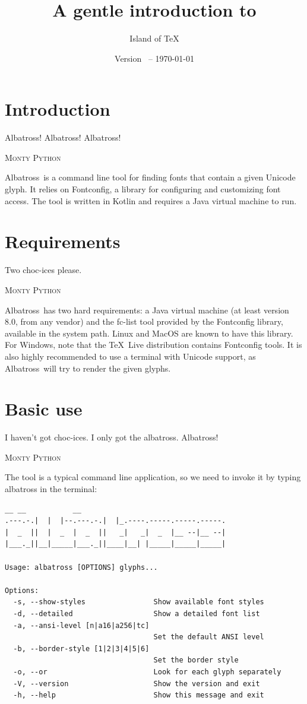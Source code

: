 \documentclass[12pt,article,a4paper,oneside]{memoir}
\title{A gentle introduction to \albatross}
\author{Island of \TeX}
\date{Version \albatrossversion\ -- \today}
\newcommand{\albatross}{Albatross}
\newcommand{\command}[1]{{\ttfamily#1}}
\begin{document}
\maketitle

\chapter{Introduction}
\label{chap:introduction}

\epigraph{Albatross! Albatross! Albatross!}{\textsc{Monty Python}}

\albatross\ is a command line tool for finding fonts that contain a given
Unicode glyph. It relies on Fontconfig, a library for configuring and
customizing font access. The tool is written in Kotlin and requires a Java
virtual machine to run.

\chapter{Requirements}
\label{chap:requirements}

\epigraph{Two choc-ices please.}{\textsc{Monty Python}}

\albatross\ has two hard requirements: a Java virtual machine (at least version
8.0, from any vendor) and the \command{fc-list} tool provided by the Fontconfig
library, available in the system path. Linux and MacOS are known to have this
library. For Windows, note that the \TeX~Live distribution contains Fontconfig
tools. It is also highly recommended to use a terminal with Unicode support, as
\albatross\ will try to render the given glyphs.

\newpage

\chapter{Basic use}
\label{chap:basicuse}

\epigraph{I haven't got choc-ices. I only got the albatross.
Albatross!}{\textsc{Monty Python}}

The tool is a typical command line application, so we need to invoke it by
typing \command{albatross} in the terminal:

\bigskip

\begin{Verbatim}[frame=single, fontsize=\small, framesep=5mm]
        __ __           __
.---.-.|  |  |--.---.-.|  |_.----.-----.-----.-----.
|  _  ||  |  _  |  _  ||   _|   _|  _  |__ --|__ --|
|___._||__|_____|___._||____|__| |_____|_____|_____|

Usage: albatross [OPTIONS] glyphs...

Options:
  -s, --show-styles                Show available font styles
  -d, --detailed                   Show a detailed font list
  -a, --ansi-level [n|a16|a256|tc]
                                   Set the default ANSI level
  -b, --border-style [1|2|3|4|5|6]
                                   Set the border style
  -o, --or                         Look for each glyph separately
  -V, --version                    Show the version and exit
  -h, --help                       Show this message and exit
\end{Verbatim}
\end{document}
